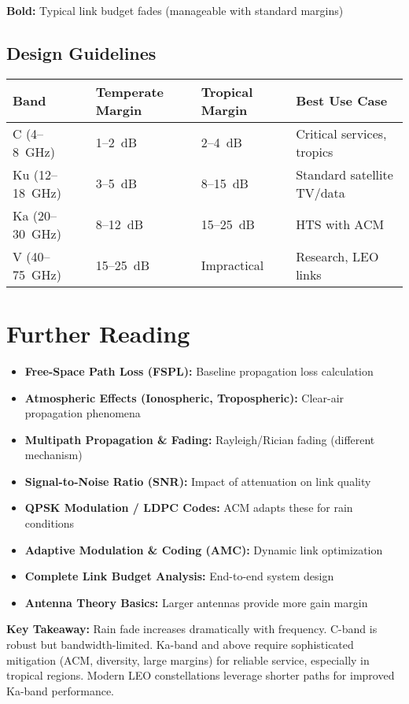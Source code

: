 \textbf{Bold:} Typical link budget fades (manageable with standard margins)

\subsection{Design Guidelines}

\begin{center}
\begin{tabular}{@{}llll@{}}
\toprule
Band & Temperate Margin & Tropical Margin & Best Use Case \\
\midrule
C (4--8~GHz) & 1--2~dB & 2--4~dB & Critical services, tropics \\
Ku (12--18~GHz) & 3--5~dB & 8--15~dB & Standard satellite TV/data \\
Ka (20--30~GHz) & 8--12~dB & 15--25~dB & HTS with ACM \\
V (40--75~GHz) & 15--25~dB & Impractical & Research, LEO links \\
\bottomrule
\end{tabular}
\end{center}

\section{Further Reading}

\begin{itemize}
\item \textbf{Free-Space Path Loss (FSPL):} Baseline propagation loss calculation
\item \textbf{Atmospheric Effects (Ionospheric, Tropospheric):} Clear-air propagation phenomena
\item \textbf{Multipath Propagation \& Fading:} Rayleigh/Rician fading (different mechanism)
\item \textbf{Signal-to-Noise Ratio (SNR):} Impact of attenuation on link quality
\item \textbf{QPSK Modulation / LDPC Codes:} ACM adapts these for rain conditions
\item \textbf{Adaptive Modulation \& Coding (AMC):} Dynamic link optimization
\item \textbf{Complete Link Budget Analysis:} End-to-end system design
\item \textbf{Antenna Theory Basics:} Larger antennas provide more gain margin
\end{itemize}

\begin{keyconcept}
\textbf{Key Takeaway:} Rain fade increases dramatically with frequency. C-band is robust but bandwidth-limited. Ka-band and above require sophisticated mitigation (ACM, diversity, large margins) for reliable service, especially in tropical regions. Modern LEO constellations leverage shorter paths for improved Ka-band performance.
\end{keyconcept}
